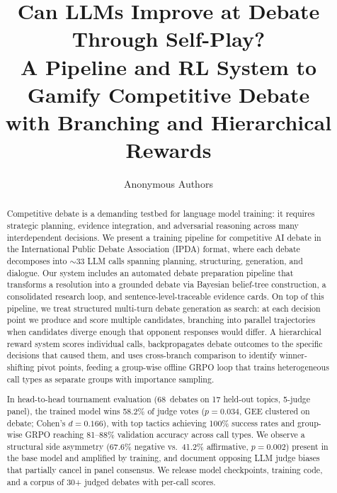 \documentclass{article}
\title{Can LLMs Improve at Debate Through Self-Play?\\A Pipeline and RL System to Gamify Competitive Debate\\with Branching and Hierarchical Rewards}
\author{Anonymous Authors}
\begin{document}
\maketitle

\begin{abstract}
Competitive debate is a demanding testbed for language model training: it
requires strategic planning, evidence integration, and adversarial reasoning
across many interdependent decisions. We present a training pipeline for
competitive AI debate in the International Public Debate Association (IPDA)
format, where each debate decomposes into ${\sim}33$ LLM calls spanning
planning, structuring, generation, and dialogue. Our system includes an
automated debate preparation pipeline that transforms a resolution into a
grounded debate via Bayesian belief-tree construction, a consolidated
research loop, and sentence-level-traceable evidence cards. On top of this
pipeline, we treat structured multi-turn debate generation as search: at each decision point we
produce and score multiple candidates, branching into parallel trajectories
when candidates diverge enough that opponent responses would differ. A
hierarchical reward system scores individual calls, backpropagates debate
outcomes to the specific decisions that caused them, and uses cross-branch
comparison to identify winner-shifting pivot points, feeding a group-wise
offline GRPO loop that trains heterogeneous call types as separate groups
with importance sampling.

In head-to-head tournament evaluation (68~debates on 17 held-out topics,
5-judge panel), the trained model wins 58.2\% of judge votes ($p = 0.034$,
GEE clustered on debate; Cohen's $d = 0.166$), with top tactics achieving
100\% success rates and group-wise GRPO reaching 81--88\% validation accuracy
across call types. We observe a structural side asymmetry (67.6\% negative
vs.\ 41.2\% affirmative, $p = 0.002$) present in the base model and amplified
by training, and document opposing LLM judge biases that partially cancel in
panel consensus. We release model checkpoints, training code, and a corpus
of 30+ judged debates with per-call scores.
\end{abstract}











\appendix












\end{document}
